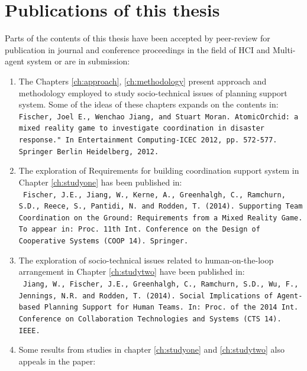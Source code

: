\section{Publications of this thesis} 
Parts of the contents of this thesis have been accepted by peer-review for publication in journal and conference proceedings in the field of HCI and Multi-agent system or are in submission:\\

\begin{enumerate}
\item The Chapters \ref{ch:approach}, \ref{ch:methodology}  present approach and methodology employed to study socio-technical issues of planning support system. Some of the ideas of these chapters expands on the contents in:\\

\texttt{Fischer, Joel E., Wenchao Jiang, and Stuart Moran. AtomicOrchid: a mixed reality game to investigate coordination in disaster response." In Entertainment Computing-ICEC 2012, pp. 572-577. Springer Berlin Heidelberg, 2012.}\\

\item The exploration of Requirements for building coordination support system in Chapter \ref{ch:studyone}  has been published in:\\ 

\texttt{ Fischer, J.E., Jiang, W., Kerne, A., Greenhalgh, C., Ramchurn, S.D., Reece, S., Pantidi, N. and Rodden, T. (2014). Supporting Team Coordination on the Ground: Requirements from a Mixed Reality Game. To appear in: Proc. 11th Int. Conference on the Design of Cooperative Systems (COOP 14). Springer.}\\


\item The exploration of socio-technical issues related to human-on-the-loop arrangement in Chapter \ref{ch:studytwo} have been published in:\\

\texttt{ Jiang, W., Fischer, J.E., Greenhalgh, C., Ramchurn, S.D., Wu, F., Jennings, N.R. and Rodden, T. (2014). Social Implications of Agent-based Planning Support for Human Teams.  In: Proc. of the 2014 Int. Conference on Collaboration Technologies and Systems (CTS 14). IEEE.}\\

\item Some results from studies in chapter \ref{ch:studyone} and \ref{ch:studytwo} also appeals in the paper:\\


\end{enumerate}
